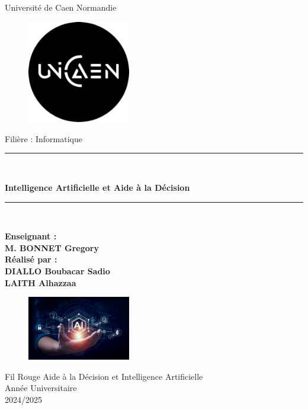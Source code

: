 \documentclass[a4paper,12pt]{article} %
\newcommand{\HRule}{\rule{\linewidth}{0.5mm}}
\begin{document}
\begin{titlepage}
    \centering

    {\large Université de Caen Normandie}

    \begin{figure}[h]
        \centering
        \includegraphics[width=0.4\textwidth]{logo.png}
    \end{figure}
    \vspace*{2cm}
    {\large Filière : Informatique\par}

    \vspace*{0.5cm}
    \HRule \\[0.4cm]
    {\huge \bfseries Intelligence Artificielle et Aide à la Décision \par}
    \HRule \\[0.4cm]

    \vspace*{\fill}

    \begin{minipage}{0.4\textwidth}
        \begin{center}
        	\textbf{Enseignant :}\\
        	 \textbf{M. BONNET Gregory}\\
        	  \textbf{Réalisé par :}\\
            \textbf{DIALLO Boubacar Sadio}\\
            \textbf{LAITH Alhazzaa}
        \end{center}
    \end{minipage}%
    \vspace*{\fill}
    
    \begin{figure}[h]
        \centering
        \includegraphics[width=0.4\textwidth]{ia.jpg}
    \end{figure}
    
    {\large Fil Rouge Aide à la Décision et Intelligence Artificielle\\ Année Universitaire\\ 2024/2025}
\end{titlepage}
\end{document}
